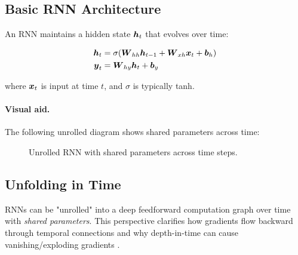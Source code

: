 \subsection{Basic RNN Architecture}

An RNN maintains a hidden state $\boldsymbol{h}_t$ that evolves over time:

\begin{align}
\boldsymbol{h}_t &= \sigma(\boldsymbol{W}_{hh} \boldsymbol{h}_{t-1} + \boldsymbol{W}_{xh} \boldsymbol{x}_t + \boldsymbol{b}_h) \\
\boldsymbol{y}_t &= \boldsymbol{W}_{hy} \boldsymbol{h}_t + \boldsymbol{b}_y
\end{align}

where $\boldsymbol{x}_t$ is input at time $t$, and $\sigma$ is typically tanh.

\paragraph{Visual aid.} The following unrolled diagram shows shared parameters across time:
\begin{figure}[h]
    \centering
    \caption{Unrolled RNN with shared parameters across time steps.}
\end{figure}

\subsection{Unfolding in Time}

RNNs can be "unrolled" into a deep feedforward computation graph over time with \emph{shared parameters}. This perspective clarifies how gradients flow backward through temporal connections and why depth-in-time can cause vanishing/exploding gradients \cite{GoodfellowEtAl2016}.

